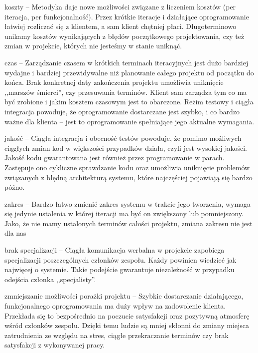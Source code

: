 \begin{packed_item}
    \item koszty -- Metodyka daje nowe możliwości związane z liczeniem kosztów (per iteracja, per funkcjonalność). Przez krótkie iteracje i działające oprogramowanie łatwiej rozliczać się z klientem, a sam klient chętniej płaci. Długoterminowo unikamy kosztów wynikających z błędów początkowego projektowania, czy też zmian w projekcie, których nie jesteśmy w stanie uniknąć.
    \item czas -- Zarządzanie czasem w krótkich terminach iteracyjnych jest dużo bardziej wydajne i bardziej przewidywalne niż planowanie całego projektu od początku do końca. Brak konkretnej daty zakończenia projektu umożliwia uniknięcie ,,marszów śmierci'', czy przesuwania terminów. Klient sam zarządza tym co ma być zrobione i jakim kosztem czasowym jest to obarczone. Reżim testowy i ciągła integracja powoduje, że oprogramowanie dostarczane jest szybko, i co bardzo ważne dla klienta -- jest to oprogramowanie spełniające jego aktualne wymagania.
    \item jakość -- Ciągła integracja i obecność testów powoduje, że pomimo możliwych ciągłych zmian kod w większości przypadków działa, czyli jest wysokiej jakości. Jakość kodu gwarantowana jest również przez programowanie w parach. Zastępuje ono cykliczne sprawdzanie kodu oraz umożliwia uniknięcie problemów związanych z błędną architekturą systemu, które najczęściej pojawiają się bardzo późno.
    \item zakres -- Bardzo łatwo zmienić zakres systemu w trakcie jego tworzenia, wymaga się jedynie ustalenia w której iteracji ma być on zwiększony lub pomniejszony. Jako, że nie mamy ustalonych terminów całości projektu, zmiana zakresu nie jest dla nas 
    \item brak specjalizacji -- Ciągła komunikacja werbalna w projekcie zapobiega specjalizacji poszczególnych członków zespołu. Każdy powinien wiedzieć jak najwięcej o systemie. Takie podejście gwarantuje niezależność w przypadku odejścia członka ,,specjalisty''.
    \item zmniejszanie możliwości porażki projektu -- Szybkie dostarczanie działającego, funkcjonalnego oprogramowania ma duży wpływ na zadowolenie klienta. Przekłada się to bezpośrednio na poczucie satysfakcji oraz pozytywną atmosferę wśród członków zespołu. Dzięki temu ludzie są mniej skłonni do zmiany miejsca zatrudnienia ze względu na stres, ciągłe przekraczanie terminów czy brak satysfakcji z wykonywanej pracy.
\end{packed_item}

